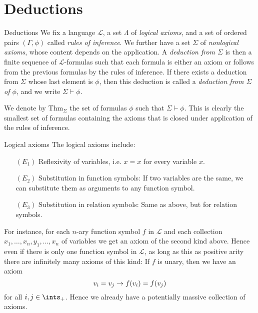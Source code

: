 \documentclass[article, a4paper, 11pt, oneside]{memoir}
\numberwithin{equation}{chapter}
\newcommand{\calL}{\mathcal{L}}
\theoremstyle{nonumberplain}
\newcommand{\posints}{\ints_+}
\begin{document}
\chapter{Deductions}

\newcommand{\proves}{\vdash}
\newcommand{\thm}[1]{\mathrm{Thm}_{#1}}
\newcommand{\colonequiv}{\mathbin{\vcentcolon\equiv}}

\begin{notelist}
    \item[Deductions]
    We fix a language $\calL$, a set $\Lambda$ of \emph{logical axioms}, and a set of ordered pairs $(\Gamma,\phi)$ called \emph{rules of inference}. We further have a set $\Sigma$ of \emph{nonlogical axioms}, whose content depends on the application. A \emph{deduction from $\Sigma$} is then a finite sequence of $\calL$-formulas such that each formula is either an axiom or follows from the previous formulas by the rules of inference. If there exists a deduction from $\Sigma$ whose last element is $\phi$, then this deduction is called a \emph{deduction from $\Sigma$ of $\phi$}, and we write $\Sigma \proves \phi$.

    We denote by $\thm{\Sigma}$ the set of formulas $\phi$ such that $\Sigma \proves \phi$. This is clearly the smallest set of formulas containing the axioms that is closed under application of the rules of inference.

    \item[Logical axioms]
    The logical axioms include:
    \begin{enumerate}
        \item[$(E_1)$] Reflexivity of variables, i.e. $x = x$ for every variable $x$.
        \item[$(E_2)$] Substitution in function symbols: If two variables are the same, we can substitute them as arguments to any function symbol.
        \item[$(E_3)$] Substitution in relation symbols: Same as above, but for relation symbols.
    \end{enumerate}
    For instance, for each $n$-ary function symbol $f$ in $\calL$ and each collection $x_1, \ldots, x_n, y_1, \ldots, x_n$ of variables we get an axiom of the second kind above. Hence even if there is only one function symbol in $\calL$, as long as this as positive arity there are infinitely many axioms of this kind: If $f$ is unary, then we have an axiom
    \begin{equation*}
        v_i = v_j \rightarrow f(v_i) = f(v_j)
    \end{equation*}
    for all $i,j \in \posints$. Hence we already have a potentially massive collection of axioms.


\end{notelist}
\end{document}
